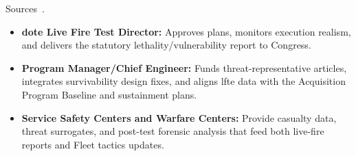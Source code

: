 \documentclass[../main.tex]{subfiles}
\begin{document}
\begin{description}[style=nextline, labelsep=0.5em, font=\bfseries]
\begin{itemize}
        \end{itemize}
  \item[\textbf{Live-fire statutory leads.}]
        Sources~\autocite{USC-10-2366,DoDI5000-89}.
        \begin{itemize}
\item \textbf{\ac{dote} Live Fire Test Director:} Approves plans, monitors execution realism, and delivers the statutory lethality/vulnerability report to Congress.
          \item \textbf{Program Manager/Chief Engineer:} Funds threat-representative articles, integrates survivability design fixes, and aligns \ac{lfte} data with the Acquisition Program Baseline and sustainment plans.
          \item \textbf{Service Safety Centers and Warfare Centers:} Provide casualty data, threat surrogates, and post-test forensic analysis that feed both live-fire reports and Fleet tactics updates.
        \end{itemize}


\end{description}
\end{document}
